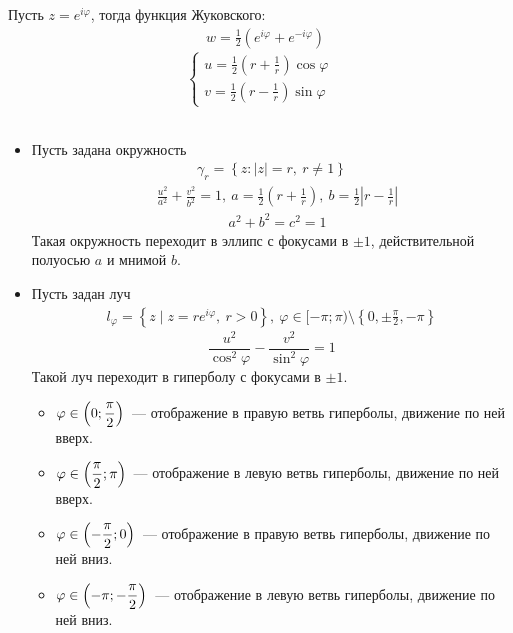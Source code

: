 Пусть $z = e^{i \varphi}$, тогда функция Жуковского:
\begin{align*}
  & w = \frac{1}{2}\left( e^{i \varphi} + e^{-i\varphi}\right)
\end{align*}
\begin{equation}\label{(24.2)}
    \begin{cases}
        u = \frac{1}{2}\left( r+\frac{1}{r} \right)\cos \varphi \\
        v = \frac{1}{2}\left( r-\frac{1}{r} \right)\sin \varphi
    \end{cases}
\end{equation}
\Example
~
\begin{itemize}
    \item Пусть задана окружность
    \begin{align*}
      \gamma_r = \left\{ z: \left| z \right| = r, \ r \neq 1\right\}
    \end{align*}
    \begin{align*}
      & \frac{u^2}{a^2} + \frac{v^2}{b^2} = 1, \ a = \frac{1}{2}\left( r + \frac{1}{r} \right), \ b = \frac{1}{2}\left|  r - \frac{1}{r} \right|
    \end{align*}
    \begin{align*}
      & a^2+b^2 = c^2 = 1
    \end{align*}
    Такая окружность переходит в эллипс с фокусами в $\pm 1$, действительной
    полуосью $a$ и мнимой $b$.
    \item Пусть задан луч
    \begin{align*}
      l_\varphi = \left\{ z \mid z = re^{i\varphi}, \ r > 0\right\}, \ \varphi \in [-\pi;\pi) \setminus \left\{ 0, \pm \frac{\pi}{2}, -\pi \right\}
    \end{align*}
    \begin{equation}\label{(24.3)}
        \frac{u^2}{\cos^2 \varphi} - \frac{v^2}{\sin^2\varphi} = 1
    \end{equation}
    Такой луч переходит в гиперболу с фокусами в $\pm 1$.
    \begin{itemize}
        \item $\varphi \in \left( 0; \displaystyle \frac{\pi}{2} \right)$~--- отображение
        в правую ветвь гиперболы, движение по ней вверх.
        \item $\varphi \in \left(\displaystyle \frac{\pi}{2}; \pi \right)$~---
        отображение в левую ветвь гиперболы, движение по ней вверх.
        \item $\varphi \in \left( - \displaystyle \frac{\pi}{2}; 0 \right)$~---
        отображение в правую ветвь гиперболы, движение по ней вниз.
        \item $\varphi \in \left( -\pi; -\displaystyle \frac{\pi}{2} \right)$~---
        отображение в левую ветвь гиперболы, движение по ней вниз.
    \end{itemize}
\end{itemize}
